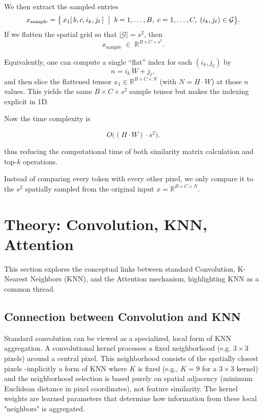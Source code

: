 \documentclass{article}
\begin{document}
We then extract the sampled entries
\[
x_{\mathrm{sample}} = \bigl\{\,x_{1}[\,b,c,i_{k},j_{\ell}\,]\;\bigm|\;b=1,\dots,B,\;c=1,\dots,C,\;(i_{k},j_{\ell})\in\mathcal{G}\bigr\}.
\]
If we flatten the spatial grid so that \(|\mathcal{G}|=s^2\), then
\[
x_{\mathrm{sample}}\;\in\;\mathbb{R}^{B\times C\times s^2}.
\]

Equivalently, one can compute a single “flat” index for each \((i_{k},j_{\ell})\) by
\[
n = i_{k}\,W + j_{\ell},
\]
and then slice the flattened tensor \(x_{1}\in\mathbb{R}^{B\times C\times N}\) (with \(N=H\cdot W\)) at those \(n\) values.  This yields the same \(B\times C\times s^2\) sample tensor but makes the indexing explicit in 1D.


Now the time complexity is

\[
O\big((H \cdot W) \cdot s^2\big).
\]

thus reducing the computational time of both similarity matrix calculation and top-\(k\) operations. 

Instead of comparing every token with every other pixel, we only compare it to the \(s^2\) spatially sampled from the original input \(x = \mathbb{R}^{B \times C \times N}\). 






\section{Theory: Convolution, KNN, Attention}
This section explores the conceptual links between standard Convolution, K-Nearest Neighbors (KNN), and the Attention mechanism, highlighting KNN as a common thread. 

\subsection{Connection between Convolution and KNN}

Standard convolution can be viewed as a specialized, local form of KNN aggregation. A convolutional kernel processes a fixed neighborhood (e.g. \(3 \times 3\) pixels) around a central pixel. This neighborhood consists of the spatially closest pixels -implicitly a form of KNN where \(K\) is fixed (e.g., \(K=9\) for a \(3 \times 3\) kernel) and the neighborhood selection is based purely on spatial adjacency (minimum Euclidean distance in pixel coordinates), not feature similarity. The kernel weights are learned parameters that determine how information from these local "neighbors" is aggregated. 
\end{document}
